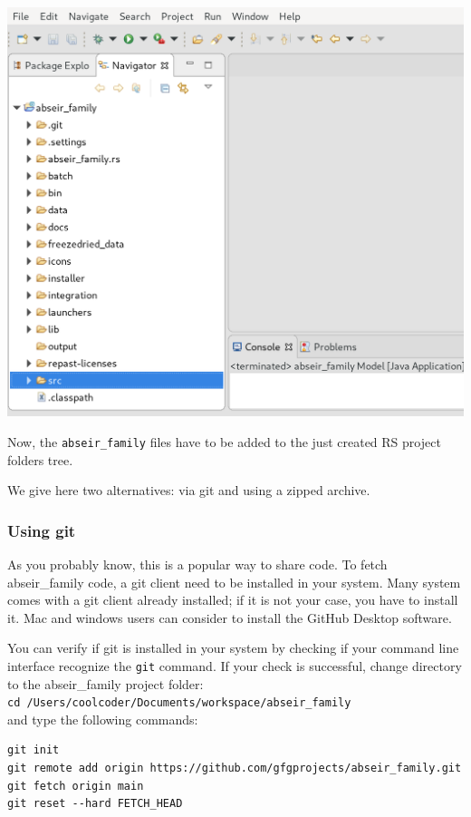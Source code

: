 \documentclass{article}
\begin{document}
\vskip2mm
\noindent
\includegraphics[scale=0.2]{fig_abseir_rs_navigation}


\vskip2mm
Now, the \verb+abseir_family+ files have to be added to the just created RS project folders tree.

We give here two alternatives: via git and using a zipped archive.

\subsubsection{Using git}

As you probably know, this is a popular way to share code. 
To fetch abseir\_family code, a git client need to be installed in your system. Many system comes with a git client already installed; if it is not your case, you have to install it. Mac and windows users can consider to install the GitHub Desktop software.

You can verify if git is installed in your system by checking if your command line interface recognize the \verb+git+ command.  
If your check is successful, change directory to the abseir\_family project folder:\\
\verb+cd /Users/coolcoder/Documents/workspace/abseir_family+\\
and type the following commands:
\begin{verbatim}
git init
git remote add origin https://github.com/gfgprojects/abseir_family.git
git fetch origin main
git reset --hard FETCH_HEAD
\end{verbatim}
\end{document}
